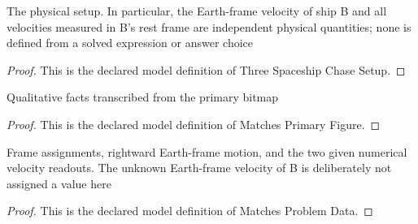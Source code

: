 \begin{definition}
  \label{def:physics:phyx-mini-0590:phyxminiproblems-problemphyxmini0590-threespaceshipchasesetup}
  The physical setup. In particular, the Earth-frame velocity of ship B and all velocities measured in B's rest frame are independent physical quantities; none is defined from a solved expression or answer choice
\end{definition}
\begin{proof}
  This is the declared model definition of Three Spaceship Chase Setup.
\end{proof}
\begin{definition}
  \label{def:physics:phyx-mini-0590:phyxminiproblems-problemphyxmini0590-matchesprimaryfigure}
  Qualitative facts transcribed from the primary bitmap
\end{definition}
\begin{proof}
  This is the declared model definition of Matches Primary Figure.
\end{proof}
\begin{definition}
  \label{def:physics:phyx-mini-0590:phyxminiproblems-problemphyxmini0590-matchesproblemdata}
  Frame assignments, rightward Earth-frame motion, and the two given numerical velocity readouts. The unknown Earth-frame velocity of B is deliberately not assigned a value here
\end{definition}
\begin{proof}
  This is the declared model definition of Matches Problem Data.
\end{proof}
